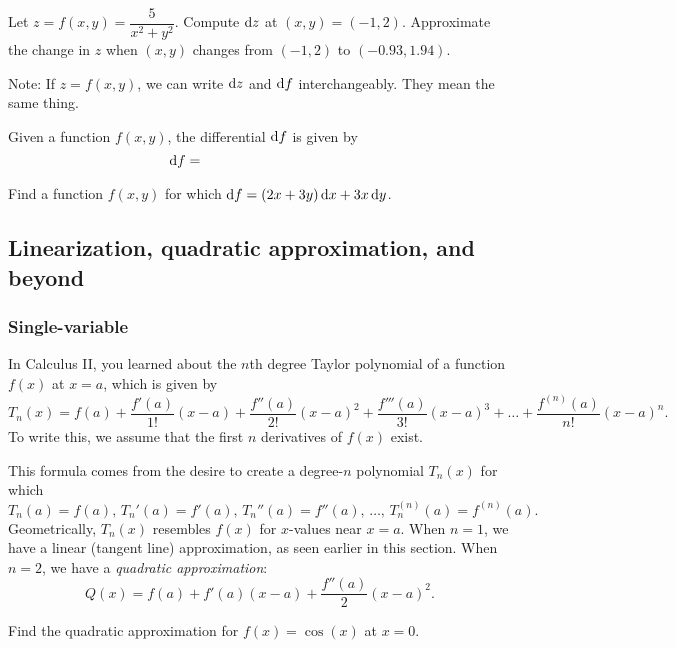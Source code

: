 \begin{ex}
Let $z=f(x,y)=\dfrac{5}{x^2+y^2}$. Compute $\mathop{}\!\mathrm{d} z$ at $(x,y)=(-1,2)$. Approximate the change in $z$ when $(x,y)$ changes from $(-1,2)$ to $(-0.93, 1.94)$.
\end{ex}

\vfill \vfill\vfill

\noindent Note: If $z=f(x,y)$, we can write $\mathop{}\!\mathrm{d} z$ and $\mathop{}\!\mathrm{d} f$ interchangeably. They mean the same thing.
\begin{defn}
    Given a function $f(x,y)$, the differential $\mathop{}\!\mathrm{d} f$ is given by 
    \[
        \dif f = \phantom{f_x(x,y)\dx + f_y(x,y)\dy}
    \]
\end{defn}

\medskip 

\begin{ex}
    Find a function $f(x,y)$ for which $\mathop{}\!\mathrm{d} f=(2x+3y)\mathop{}\!\mathrm{d} x+3x\mathop{}\!\mathrm{d} y$.
\end{ex}

\vfill

\pagebreak 

\subsection{Linearization, quadratic approximation, and beyond}
\subsubsection{Single-variable}
In Calculus II, you learned about the $n$th degree Taylor polynomial of a function $f(x)$ at $x=a$, which is given by
\[
    T_n(x)=f(a)+\dfrac{f'(a)}{1!}(x-a)+\dfrac{f''(a)}{2!}(x-a)^2+\dfrac{f'''(a)}{3!}(x-a)^3+\dots+\dfrac{f^{(n)}(a)}{n!}(x-a)^n.
\]
To write this, we assume that the first $n$ derivatives of $f(x)$ exist.

This formula comes from the desire to create a degree-$n$ polynomial $T_n(x)$ for which 
\[
    T_n(a)=f(a),\, T_n'(a)=f'(a),\, T_n''(a)=f''(a),\, \dots,\, T_n^{(n)}(a)=f^{(n)}(a).
\]
Geometrically, $T_n(x)$ resembles $f(x)$ for $x$-values near $x=a$. When $n=1$, we have a linear (tangent line) approximation, as seen earlier in this section. When $n=2$, we have a \emph{quadratic approximation}:
\[
    Q(x)=f(a)+f'(a)(x-a)+\dfrac{f''(a)}{2}(x-a)^2.
\]

\begin{ex}
    Find the quadratic approximation for $f(x)=\cos(x)$ at $x=0$.
\end{ex}

